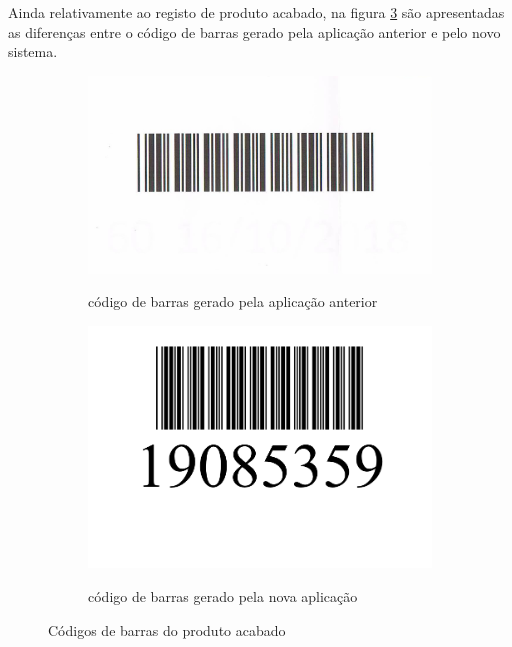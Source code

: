 Ainda relativamente ao registo de produto acabado, na figura \ref{fig:comparacao_prodacabadocb} são apresentadas as diferenças entre o código de barras gerado pela aplicação anterior e pelo novo sistema.
\begin{figure}[H]
	\centering
	
	\begin{subfigure}[t]{0.45\linewidth}
		\includegraphics[width=\linewidth]{figuras/AppAccess/5-CodBarras.jpg}
		\label{fig:comparacao_prodacabadocb_1}
		\caption{código de barras gerado pela aplicação anterior}
	\end{subfigure}
	\begin{subfigure}[t]{0.45\linewidth}
		\includegraphics[width=\linewidth]{figuras/AppPhp/5-CodBarras.png}
		\label{fig:comparacao_prodacabadocb_2}
		\caption{código de barras gerado pela nova aplicação}
	\end{subfigure}
	
	\caption{Códigos de barras do produto acabado}
	\label{fig:comparacao_prodacabadocb}
\end{figure}

